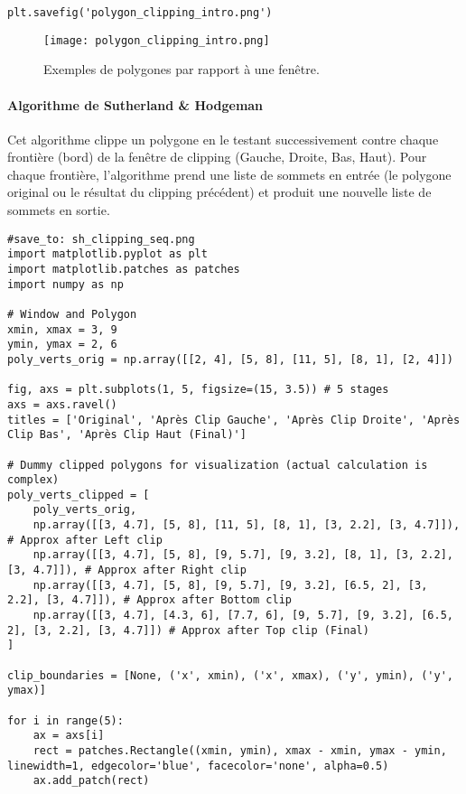 \documentclass{article}
\begin{document}
{\begin{verbatim}
plt.savefig('polygon_clipping_intro.png')
\end{verbatim}

\begin{figure}[H]
\centering
\texttt{[image: polygon\_clipping\_intro.png]}
\caption{Exemples de polygones par rapport à une fenêtre.}
\label{fig:polygon_clipping_intro}
\end{figure}

\paragraph{Algorithme de Sutherland \& Hodgeman}
Cet algorithme clippe un polygone en le testant successivement contre chaque frontière (bord) de la fenêtre de clipping (Gauche, Droite, Bas, Haut). Pour chaque frontière, l'algorithme prend une liste de sommets en entrée (le polygone original ou le résultat du clipping précédent) et produit une nouvelle liste de sommets en sortie.

\begin{verbatim}
#save_to: sh_clipping_seq.png
import matplotlib.pyplot as plt
import matplotlib.patches as patches
import numpy as np

# Window and Polygon
xmin, xmax = 3, 9
ymin, ymax = 2, 6
poly_verts_orig = np.array([[2, 4], [5, 8], [11, 5], [8, 1], [2, 4]])

fig, axs = plt.subplots(1, 5, figsize=(15, 3.5)) # 5 stages
axs = axs.ravel()
titles = ['Original', 'Après Clip Gauche', 'Après Clip Droite', 'Après Clip Bas', 'Après Clip Haut (Final)']

# Dummy clipped polygons for visualization (actual calculation is complex)
poly_verts_clipped = [
    poly_verts_orig,
    np.array([[3, 4.7], [5, 8], [11, 5], [8, 1], [3, 2.2], [3, 4.7]]), # Approx after Left clip
    np.array([[3, 4.7], [5, 8], [9, 5.7], [9, 3.2], [8, 1], [3, 2.2], [3, 4.7]]), # Approx after Right clip
    np.array([[3, 4.7], [5, 8], [9, 5.7], [9, 3.2], [6.5, 2], [3, 2.2], [3, 4.7]]), # Approx after Bottom clip
    np.array([[3, 4.7], [4.3, 6], [7.7, 6], [9, 5.7], [9, 3.2], [6.5, 2], [3, 2.2], [3, 4.7]]) # Approx after Top clip (Final)
]

clip_boundaries = [None, ('x', xmin), ('x', xmax), ('y', ymin), ('y', ymax)]

for i in range(5):
    ax = axs[i]
    rect = patches.Rectangle((xmin, ymin), xmax - xmin, ymax - ymin, linewidth=1, edgecolor='blue', facecolor='none', alpha=0.5)
    ax.add_patch(rect)


\end{verbatim}}
\end{document}
